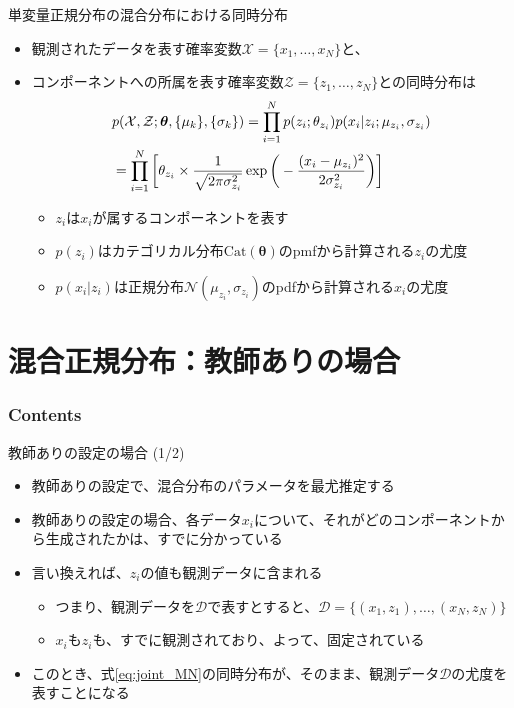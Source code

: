 \documentclass[aspectratio=169,unicode,dvipdfmx,14pt]{beamer}
\begin{document}
\begin{frame}{単変量正規分布の混合分布における同時分布}
\vspace{-.1in}
\begin{itemize}
\item 観測されたデータを表す確率変数$\mathcal{X} = \{x_1, \ldots, x_N\}$と、
\item[] コンポーネントへの所属を表す確率変数$\mathcal{Z} = \{z_1,\ldots,z_N\}$との同時分布は
\vspace{-.1in}
\begin{align}
& p( \mathcal{X}, \mathcal{Z} ;\bm{\theta}, \{ \mu_k \}, \{ \sigma_k \})
= \prod_{i=1}^N p(z_i ; \theta_{z_i}) p(x_i | z_i ; \mu_{z_i}, \sigma_{z_i})
\notag \\ &
= \prod_{i=1}^N \bigg[ \theta_{z_i} \times \frac{1}{\sqrt{2\pi\sigma_{z_i}^2}}\exp\bigg( - \frac{(x_i - \mu_{z_i})^2 }{2\sigma_{z_i}^2} \bigg) \bigg]
\label{eq:joint_MN}
\end{align}
\vspace{-.15in}
\begin{itemize}
\item $z_i$は$x_i$が属するコンポーネントを表す
\item $p(z_i)$はカテゴリカル分布$\mbox{Cat}(\bm{\theta})$のpmfから計算される$z_i$の尤度
\item $p(x_i | z_i)$は正規分布$\mathcal{N}(\mu_{z_i}, \sigma_{z_i})$のpdfから計算される$x_i$の尤度
\end{itemize}
\end{itemize}
\end{frame}


\section{混合正規分布：教師ありの場合}

\begin{frame}\frametitle{Contents}
\Large \tableofcontents[currentsection]
\end{frame}


\begin{frame}{教師ありの設定の場合 (1/2)}
\begin{itemize}
\item 教師ありの設定で、混合分布のパラメータを最尤推定する
\item 教師ありの設定の場合、各データ$x_i$について、それがどのコンポーネントから生成されたかは、すでに分かっている
\item 言い換えれば、$z_i$の値も観測データに含まれる
\begin{itemize}
\item つまり、観測データを$\mathcal{D}$で表すとすると、$\mathcal{D} = \{ (x_1,z_1), \ldots, (x_N,z_N) \}$
\item $x_i$も$z_i$も、すでに観測されており、よって、固定されている
\end{itemize}
\item このとき、式\eqref{eq:joint_MN}の同時分布が、そのまま、観測データ$\mathcal{D}$の尤度を表すことになる
\end{itemize}
\end{frame}
\end{document}

